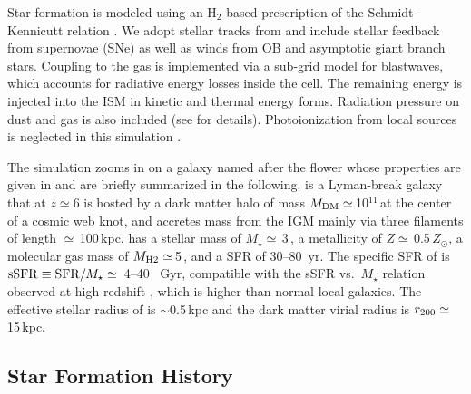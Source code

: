 \IfFileExists{emulateapjlegacy.cls}{\documentclass[iop]{emulateapjlegacy}}{\documentclass[iop]{emulateapj}}
\newcommand{\AP}[1]{({\bf \color{apcolor} AP: #1})}
\newcommand{\MM}[1]{({\bf \color{mmcolor} MM: #1})}
\begin{document}
Star formation is modeled using an H$_2$-based prescription of the Schmidt-Kennicutt relation \citep{Krumholz09a}. We adopt stellar tracks from  and include stellar feedback from supernovae (SNe) 
   as well as winds from OB and asymptotic giant branch stars.
Coupling to the gas is implemented via a sub-grid model for blastwaves, which accounts for radiative energy losses inside the cell. The remaining energy is injected into the ISM in kinetic and thermal energy forms. Radiation pressure on dust and gas is also included (see \citealt{Pallottini17a} for details).  
Photoionization from local sources is neglected in this simulation
\citep[see][for its effect]{pallottini:2019,decataldo:2019}. 

The simulation zooms in on a galaxy named
   after the flower 
\flower whose properties are given in 
      \citet{Pallottini17a} 
and are briefly summarized in the following. \flower is a Lyman-break galaxy 
that at $z\simeq 6$ is hosted by a dark matter halo of mass $M_{\rm
  DM}\simeq$\,10$^{11}$\,\Msun at the center of a cosmic web knot, and
accretes mass from the IGM mainly via three filaments of length
$\simeq$\,100\,kpc. \flower has a stellar mass of
$M_\star\simeq$\,3\,\Msun, a metallicity of
$Z\simeq$\,0.5\,$Z_{\odot}$, a molecular gas mass of $M_{\rm
  H2}\simeq$\,5\,\Msun, and a SFR of
   30--80 \Msun\,yr\pmOne. 
The specific SFR of \flower is ${\rm sSFR} \equiv {\rm SFR}/M_{\star}
\simeq$~4--40 ~Gyr\pmOne, compatible with the sSFR vs.\ $M_{\star}$
relation observed at high redshift \citep{Jiang2016}, which is higher
than normal local galaxies. The effective stellar radius of \flower
is $\sim$0.5\,kpc and the dark matter virial radius is $r_{\rm
  200}\simeq$\,15\,kpc. 

\subsection{Star Formation History} \label{sec:sfh}
\end{document}
